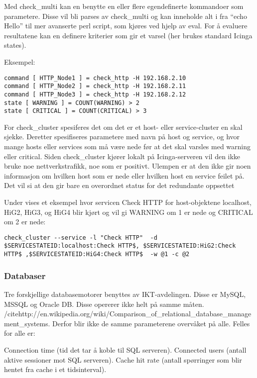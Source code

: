 Med check\_multi kan en benytte en eller flere egendefinerte kommandoer som parametere. Disse vil bli parses av check\_multi og kan inneholde alt i fra “echo Hello” til mer avanserte perl script, som kjøres ved hjelp av eval. For å evaluere resultatene kan en definere kriterier som gir et varsel (her brukes standard Icinga states). 

Eksempel:
\begin{lstlisting}
command [ HTTP_Node1 ] = check_http -H 192.168.2.10
command [ HTTP_Node2 ] = check_http -H 192.168.2.11
command [ HTTP_Node3 ] = check_http -H 192.168.2.12
state [ WARNING ] = COUNT(WARNING) > 2
state [ CRITICAL ] = COUNT(CRITICAL) > 3
\end{lstlisting}
For check\_cluster spesiferes det om det er et host- eller service-cluster en skal sjekke. Deretter spesifiseres parametere med navn på host og service, og hvor mange hosts eller services som må være nede før at det skal varsles med warning eller critical. Siden check\_cluster kjører lokalt på Icinga-serveren vil den ikke bruke noe nettverkstrafikk, noe som er positivt. Ulempen er at den ikke gir noen informasjon om hvilken host som er nede eller hvilken host en service feilet på. Det vil si at den gir bare en overordnet status for det redundante oppsettet     

Under vises et eksempel hvor servicen Check HTTP for host-objektene localhost, HiG2, HiG3, og HiG4 blir kjørt og vil gi WARNING om 1 er nede og CRITICAL om 2 er nede: 
\begin{lstlisting}
check_cluster --service -l "Check HTTP"  -d $SERVICESTATEID:localhost:Check HTTP$, $SERVICESTATEID:HiG2:Check HTTP$ ,$SERVICESTATEID:HiG4:Check HTTP$  -w @1 -c @2
\end{lstlisting}

\subsubsection{Databaser}
Tre forskjellige databasemotorer benyttes av IKT-avdelingen. Disse er MySQL, MSSQL og Oracle DB. Disse opererer ikke helt på samme måten. /cite{http://en.wikipedia.org/wiki/Comparison\_of\_relational\_database\_management\_systems}. Derfor blir ikke de samme parameterene overvåket på alle. Felles for alle er:

Connection time (tid det tar å koble til SQL serveren).
Connected users (antall aktive sessioner mot SQL serveren).
Cache hit rate (antall spørringer som blir hentet fra cache i et tidsinterval).


